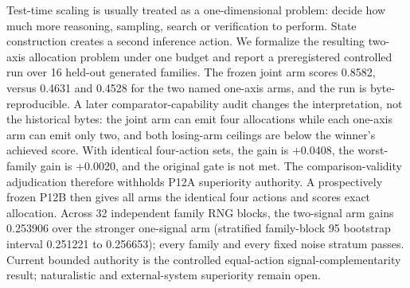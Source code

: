 \markdownRendererDocumentBegin
Test-time scaling is usually treated as a one-dimensional problem: decide how much more reasoning, sampling, search or verification to perform. State construction creates a second inference action. We formalize the resulting two-axis allocation problem under one budget and report a preregistered controlled run over 16 held-out generated families. The frozen joint arm scores 0.8582, versus 0.4631 and 0.4528 for the two named one-axis arms, and the run is byte-reproducible. A later comparator-capability audit changes the interpretation, not the historical bytes: the joint arm can emit four allocations while each one-axis arm can emit only two, and both losing-arm ceilings are below the winner's achieved score. With identical four-action sets, the gain is +0.0408, the worst-family gain is +0.0020, and the original gate is not met. The comparison-validity adjudication therefore withholds P12A superiority authority. A prospectively frozen P12B then gives all arms the identical four actions and scores exact allocation. Across 32 independent family RNG blocks, the two-signal arm gains 0.253906 over the stronger one-signal arm (stratified family-block 95\markdownRendererPercentSign{} bootstrap interval 0.251221 to 0.256653); every family and every fixed noise stratum passes. Current bounded authority is the controlled equal-action signal-complementarity result; naturalistic and external-system superiority remain open.\markdownRendererDocumentEnd